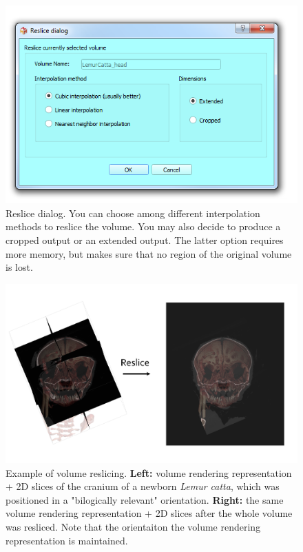 \begin{figure}
  \centering
  \includegraphics[scale=0.5]{images/14/reslice/reslice_dialog.png}
\caption{Reslice dialog. You can choose among different interpolation methods to reslice the volume. You may also decide to produce a cropped output or an extended output. The latter option requires more memory, but makes sure that no region of the original volume is lost.}	
\label{reslice_dialog}
 \end{figure}


\begin{figure}
  \centering
  \includegraphics[scale=0.35]{images/14/reslice/reslice_example.png}
\caption{ Example of volume reslicing. \textbf{Left:} volume rendering representation + 2D slices of the cranium of a newborn \textit{Lemur catta}, which was positioned in a "bilogically relevant" orientation. \textbf{Right:} the same volume rendering representation + 2D slices after the whole volume was resliced. Note that the orientaiton the volume rendering representation is maintained.}	
\label{reslice_example}
 \end{figure}




